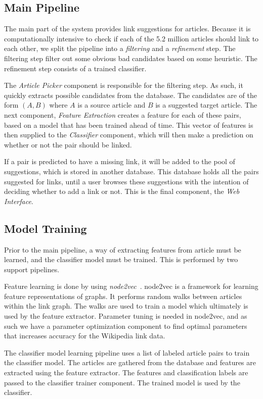 

\subsection{Main Pipeline}
The main part of the system provides link suggestions for articles. Because it is computationally intensive to check if each of the 5.2 million articles should link to each other, we split the pipeline into a \emph{filtering} and a \emph{refinement} step. The filtering step filter out some obvious bad candidates based on some heuristic. The refinement step consists of a trained classifier.

The \emph{Article Picker} component is responsible for the filtering step. As such, it quickly extracts possible candidates from the database. The candidates are of the form $(A,B)$ where $A$ is a source article and $B$ is a suggested target article. The next component, \emph{Feature Extraction} creates a feature for each of these pairs, based on a model that has been trained ahead of time. This vector of features is then supplied to the \emph{Classifier} component, which will then make a prediction on whether or not the pair should be linked.

If a pair is predicted to have a missing link, it will be added to the pool of suggestions, which is stored in another database. This database holds all the pairs suggested for links, until a user browses these suggestions with the intention of deciding whether to add a link or not. This is the final component, the \emph{Web Interface}.


\subsection{Model Training}
Prior to the main pipeline, a way of extracting features from article must be learned, and the classifier model must be trained. This is performed by two support pipelines.

Feature learning is done by using \emph{node2vec}~\cite{node2vec}. node2vec is a framework for learning feature representations of graphs. It performs random walks between articles within the link graph. The walks are used to train a model which ultimately is used by the feature extractor. Parameter tuning is needed in node2vec, and as such we have a parameter optimization component to find optimal parameters that increases accuracy for the Wikipedia link data.

The classifier model learning pipeline uses a list of labeled article pairs to train the classifier model. The articles are gathered from the database and features are extracted using the feature extractor. The features and classification labels are passed to the classifier trainer component. The trained model is used by the classifier.










